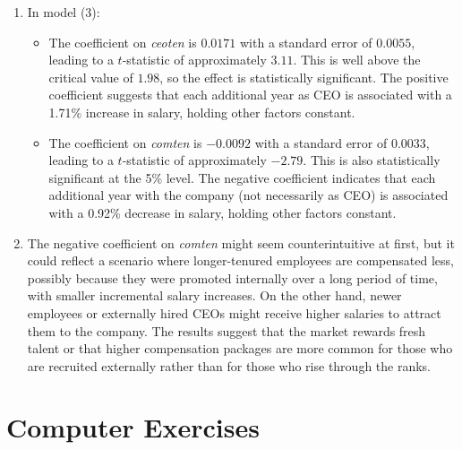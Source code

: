 \documentclass[12pt]{article}
\begin{document}
\begin{enumerate}
{\begin{enumerate}
\item In model (3):
\begin{itemize}
    \item The coefficient on \textit{ceoten} is $0.0171$ with a standard error of $0.0055$, leading to a $t$-statistic of approximately $3.11$. This is well above the critical value of $1.98$, so the effect is statistically significant. The positive coefficient suggests that each additional year as CEO is associated with a 1.71\% increase in salary, holding other factors constant.
    \item The coefficient on \textit{comten} is $-0.0092$ with a standard error of $0.0033$, leading to a $t$-statistic of approximately $-2.79$. This is also statistically significant at the 5\% level. The negative coefficient indicates that each additional year with the company (not necessarily as CEO) is associated with a 0.92\% decrease in salary, holding other factors constant.
\end{itemize}

\item The negative coefficient on \textit{comten} might seem counterintuitive at first, but it could reflect a scenario where longer-tenured employees are compensated less, possibly because they were promoted internally over a long period of time, with smaller incremental salary increases. On the other hand, newer employees or externally hired CEOs might receive higher salaries to attract them to the company. The results suggest that the market rewards fresh talent or that higher compensation packages are more common for those who are recruited externally rather than for those who rise through the ranks.

\end{enumerate}
}


\end{enumerate}

\section*{Computer Exercises}
\end{document}
